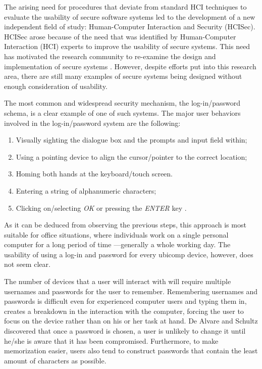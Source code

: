 \documentclass{article}
\begin{document}
The arising need for procedures that deviate from standard HCI techniques to evaluate the usability of secure software systems led to the development of a new independent field of study: Human-Computer Interaction and Security (HCISec). HCISec arose because of the need that was identified by Human-Computer Interaction (HCI) experts to improve the usability of secure systems. This need has motivated the research community to re-examine the design and implementation of secure systems \cite{kainda2010security}. However, despite efforts put into this research area, there are still many examples of secure systems being designed without enough consideration of usability.

The most common and widespread security mechanism, the log-in/password schema, is a clear example of one of such systems. The major user behaviors involved in the log-in/password system are the following:
\begin{enumerate}
\item Visually sighting the dialogue box and the prompts and input field within;
\item Using a pointing device to align the cursor/pointer to the correct location;
\item Homing both hands at the keyboard/touch screen.
\item Entering a string of alphanumeric characters;
\item Clicking on/selecting \textit{OK} or pressing the \textit{ENTER} key \cite{schultz2001usability}.
\end{enumerate}

As it can be deduced from observing the previous steps, this approach is most suitable for office situations, where individuals work on a single personal computer for a long period of time ---generally a whole working day. The usability of using a log-in and password for every ubicomp device, however, does not seem clear. 

The number of devices that a user will interact with will require multiple usernames and passwords for the user to remember. Remembering usernames and passwords is difficult even for experienced computer users and typing them in, creates a breakdown in the interaction with the computer, forcing the user to focus on the device rather than on his or her task at hand.  De Alvare and Schultz\cite{dealvare1988framework} discovered that once a password is chosen, a user is unlikely to change it until he/she is aware that it has been compromised. Furthermore, to make memorization easier, users also tend to construct passwords that contain the least amount of characters as possible.
\end{document}
